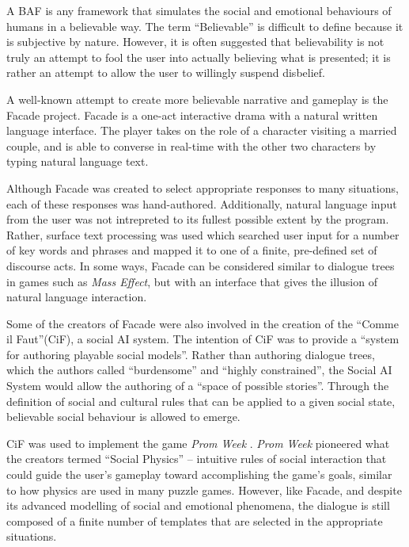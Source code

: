 \documentclass{article}
\begin{document}
A BAF is any framework that simulates the social and emotional
behaviours of humans in a believable way.  The term ``Believable'' is
difficult to define because it is subjective by nature.  However, it
is often suggested that believability is not truly an attempt to fool
the user into actually believing what is presented; it is rather an
attempt to allow the user to willingly suspend disbelief. \cite{Acton2009}

A well-known attempt to create more believable narrative and gameplay
is the Facade
project\cite{Mateas}.  Facade is a one-act interactive drama with a
natural written language interface.  The player takes on the role of a
character visiting a married couple, and is able to converse in
real-time with the other two characters by typing natural language
text.

Although Facade was created to select appropriate responses to many
situations, each of these responses was hand-authored.  Additionally,
natural language input from the user was not intrepreted to its
fullest possible extent by the program.  Rather, surface text
processing was used which searched user input for a number of key
words and phrases and mapped it to one of a finite, pre-defined set of
discourse acts. \cite{Mateasa}  In some ways, Facade can be considered
similar to dialogue trees in games such as \emph{Mass Effect}, but with an
interface that gives the illusion of natural language interaction.

Some of the creators of Facade were also involved in the
creation of the ``Comme il Faut''(CiF)\cite{Mccoy2010}, a social AI
system.  The intention of CiF was to provide a ``system for authoring playable social
models''\cite{Mccoy2010}.  Rather than authoring dialogue trees, which
the authors called ``burdensome''  and ``highly constrained'', the
Social AI System  would allow the authoring of a ``space of possible
stories''.  Through the definition of social and cultural rules that
can be applied to a given social state, believable social behaviour is
allowed to emerge.

CiF was used to implement the game \emph{Prom Week} \cite{Mateas2011}.
\emph{Prom Week} pioneered what the creators termed ``Social
Physics''\cite{Mccoy2011} -- intuitive rules of social
interaction that could guide the user's gameplay toward accomplishing
the game's goals, similar to how physics are used in many puzzle
games.  However, like Facade, and despite its advanced modelling of
social and emotional phenomena, the dialogue is still composed of a
finite number of templates that are selected in the appropriate
situations.
\end{document}
